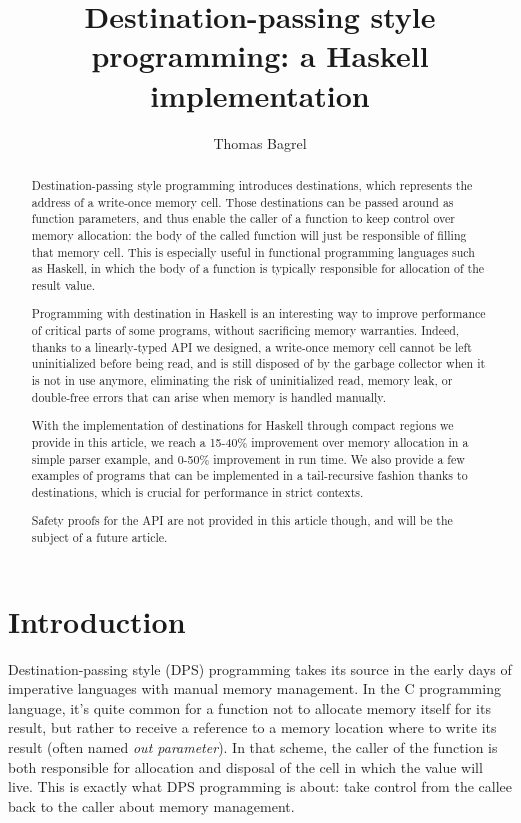 \documentclass[english]{jflart}
\title{Destination-passing style programming: a Haskell implementation}
\author[1]{Thomas Bagrel}
\affil[1]{INRIA/LORIA, Vand\oe{}uvre-lès-Nancy, 54500, France}
\affil[2]{TWEAG, Paris, 75012, France}
\begin{document}
\maketitle

\begin{abstract}
Destination-passing style programming introduces destinations, which represents the address of a write-once memory cell. Those destinations can be passed around as function parameters, and thus enable the caller of a function to keep control over memory allocation: the body of the called function will just be responsible of filling that memory cell. This is especially useful in functional programming languages such as Haskell, in which the body of a function is typically responsible for allocation of the result value.

Programming with destination in Haskell is an interesting way to improve performance of critical parts of some programs, without sacrificing memory warranties. Indeed, thanks to a linearly-typed API we designed, a write-once memory cell cannot be left uninitialized before being read, and is still disposed of by the garbage collector when it is not in use anymore, eliminating the risk of uninitialized read, memory leak, or double-free errors that can arise when memory is handled manually.

With the implementation of destinations for Haskell through compact regions we provide in this article, we reach a 15-40\% improvement over memory allocation in a simple parser example, and 0-50\% improvement in run time. We also provide a few examples of programs that can be implemented in a tail-recursive fashion thanks to destinations, which is crucial for performance in strict contexts.

Safety proofs for the API are not provided in this article though, and will be the subject of a future article.
\end{abstract}

\tableofcontents{}

\section{Introduction}

Destination-passing style (DPS) programming takes its source in the early days of imperative languages with manual memory management. In the C programming language, it's quite common for a function not to allocate memory itself for its result, but rather to receive a reference to a memory location where to write its result (often named \emph{out parameter}). In that scheme, the caller of the function is both responsible for allocation and disposal of the cell in which the value will live. This is exactly what DPS programming is about: take control from the callee back to the caller about memory management.
\end{document}
